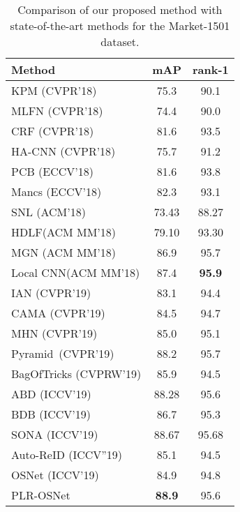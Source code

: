 \documentclass[journal]{IEEEtran}
\begin{document}
\begin{table}
\begin{center}
\label{my-label}
\begin{tabular}{l||cc}
\toprule[1.5pt]
Method     & mAP & rank-1  \\\hline
KPM \cite{shen2018KPM}(CVPR'18)       & 75.3 & 90.1   \\
MLFN \cite{chang2018MFN}(CVPR'18)     & 74.4 & 90.0   \\
CRF \cite{chen2018CRF}(CVPR'18)       & 81.6 & 93.5   \\
HA-CNN \cite{li2018harmonious}(CVPR'18) & 75.7 & 91.2   \\
PCB \cite{sun2018beyond}(ECCV'18)       & 81.6 & 93.8  \\
Mancs \cite{wang2018mancs} (ECCV'18)                         & 82.3 & 93.1 \\
SNL \cite{li2018SNL}(ACM'18) & 73.43 & 88.27  \\
HDLF\cite{zeng2018HDLF}(ACM MM'18) & 79.10 & 93.30  \\
MGN \cite{wang2018MGN}(ACM MM'18) & 86.9 & 95.7  \\
Local CNN\cite{yang2018LCNN}(ACM MM'18) & 87.4 & \bf 95.9  \\
IAN \cite{hou2019IAN} (CVPR'19)       & 83.1 & 94.4  \\
CAMA \cite{yang2019CAMA}(CVPR'19)       & 84.5 & 94.7 \\
MHN \cite{chen2019MHN}(CVPR'19)       & 85.0 & 95.1   \\
Pyramid~\cite{zheng2019pyramid}(CVPR'19) & 88.2 & 95.7 \\
BagOfTricks \cite{he2019Bag} (CVPRW'19)                   & 85.9 & 94.5 \\
ABD \cite{chen2019ABD} (ICCV'19)       & 88.28 &95.6  \\
BDB \cite{dai2019BDB} (ICCV'19)       & 86.7 & 95.3  \\
SONA \cite{xia2019SONA} (ICCV'19)       & 88.67 &95.68  \\
Auto-ReID \cite{quan2019Auto} (ICCV''19)                    & 85.1 & 94.5 \\
OSNet \cite{zhou2019OSNet} (ICCV'19)                       & 84.9 & 94.8  \\\hline
PLR-OSNet       & \bf88.9 & 95.6 \\
\bottomrule[1.5pt]
\end{tabular}
\end{center}
\caption{Comparison of our proposed method with state-of-the-art methods for the Market-1501 dataset.}
\label{tb:market1501}
\end{table}
\end{document}
